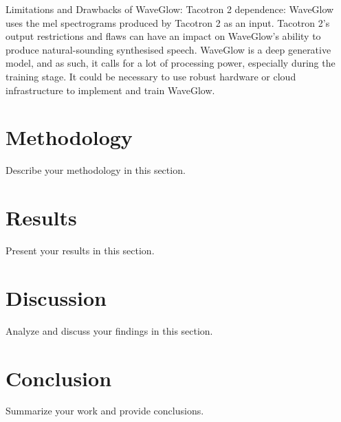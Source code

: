 \documentclass{article}
\begin{document}
Limitations and Drawbacks of WaveGlow:
Tacotron 2 dependence: WaveGlow uses the mel spectrograms produced by Tacotron 2 as an input. Tacotron 2's output restrictions and flaws can have an impact on WaveGlow's ability to produce natural-sounding synthesised speech.
WaveGlow is a deep generative model, and as such, it calls for a lot of processing power, especially during the training stage. It could be necessary to use robust hardware or cloud infrastructure to implement and train WaveGlow.



\section{Methodology}
Describe your methodology in this section.

\section{Results}
Present your results in this section.

\section{Discussion}
Analyze and discuss your findings in this section.

\section{Conclusion}
Summarize your work and provide conclusions.


\end{document}

